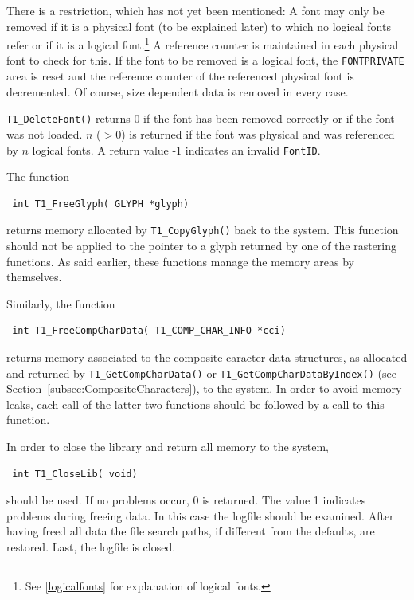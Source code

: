 There is a restriction, which has not yet been mentioned: A font may only be
removed if it is a physical font (to be explained later) to which no logical
fonts refer or if it is a logical font.\footnote{See \ref{logicalfonts} for
  explanation of logical fonts.} A reference counter is maintained in each
physical font to check for this. If the font to be removed is a logical font,
the \verb+FONTPRIVATE+ area is reset and the reference counter of the
referenced physical font is decremented. Of course, size dependent data is
removed in every case.

\verb+T1_DeleteFont()+ returns 0 if the font has been removed correctly or if
the font was not loaded. $n$ ($>0$) is returned if
the font was physical and was referenced by $n$ logical fonts. A
return value -1 indicates an invalid \verb+FontID+.

The function 
\precorr
\begin{verbatim}
 int T1_FreeGlyph( GLYPH *glyph)
\end{verbatim}\postcorr
returns memory allocated by
\verb+T1_CopyGlyph()+ back to the system. This function should not be
applied to the pointer to a glyph returned by one of the rastering
functions. As said earlier, these functions manage the memory areas by
themselves. 

Similarly, the function
\precorr
\begin{verbatim}
 int T1_FreeCompCharData( T1_COMP_CHAR_INFO *cci)
\end{verbatim}\postcorr
returns memory associated to the composite caracter data structures, as
allocated and returned by \verb+T1_GetCompCharData()+ or
\verb+T1_GetCompCharDataByIndex()+ (see
Section~\ref{subsec:CompositeCharacters}), to the system. In order to avoid
memory leaks, each call of the latter two functions should be followed by a
call to this function.


In order to close the library and return all memory to the system, 
\precorr
\begin{verbatim}
 int T1_CloseLib( void)
\end{verbatim}\postcorr
should be used. If no problems occur, 0 is returned. The value 1 indicates
problems during freeing data. In this case the logfile should be examined. 
After having freed all data the file search paths, if different from the
defaults, are restored. Last, the logfile  is closed.


